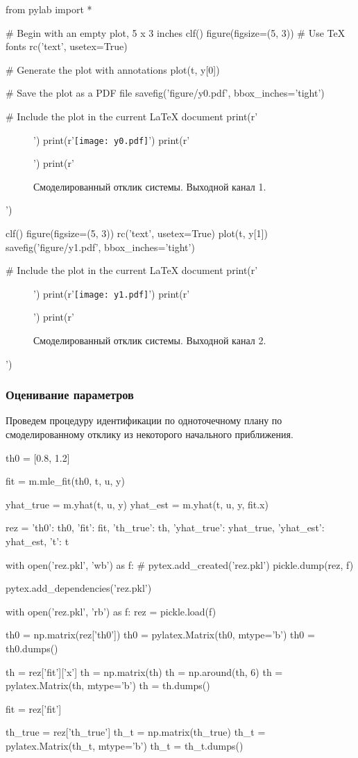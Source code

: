 \documentclass[a4paper,14pt]{extarticle}
\begin{document}
\begin{pycode}[model]
from pylab import *

# Begin with an empty plot, 5 x 3 inches
clf()
figure(figsize=(5, 3))
# Use TeX fonts
rc('text', usetex=True)

# Generate the plot with annotations
plot(t, y[0])

# Save the plot as a PDF file
savefig('figure/y0.pdf', bbox_inches='tight')

# Include the plot in the current LaTeX document
print(r'\begin{figure}[H]')
print(r'\texttt{[image: y0.pdf]}')
print(r'\caption{Смоделированный отклик системы. Выходной канал 1.}')
print(r'\end{figure}')

clf()
figure(figsize=(5, 3))
rc('text', usetex=True)
plot(t, y[1])
savefig('figure/y1.pdf', bbox_inches='tight')

# Include the plot in the current LaTeX document
print(r'\begin{figure}[H]')
print(r'\texttt{[image: y1.pdf]}')
print(r'\caption{Смоделированный отклик системы. Выходной канал 2.}')
print(r'\end{figure}')
\end{pycode}
\renewcommand{\baselinestretch}{1.5}

\subsubsection{Оценивание параметров}

Проведем процедуру идентификации по одноточечному плану по смоделированному
отклику из некоторого начального приближения.

\begin{pycode}[model]
th0 = [0.8, 1.2]


fit = m.mle_fit(th0, t, u, y)


yhat_true = m.yhat(t, u, y)
yhat_est = m.yhat(t, u, y, fit.x)

rez = {'th0': th0, 'fit': fit, 'th_true': th, 'yhat_true': yhat_true,
	'yhat_est': yhat_est, 't': t}

with open('rez.pkl', 'wb') as f:
	# pytex.add_created('rez.pkl')
	pickle.dump(rez, f)

\end{pycode}

\begin{pycode}
pytex.add_dependencies('rez.pkl')

with open('rez.pkl', 'rb') as f:
	rez = pickle.load(f)

th0 = np.matrix(rez['th0'])
th0 = pylatex.Matrix(th0, mtype='b')
th0 = th0.dumps()

th = rez['fit']['x']
th = np.matrix(th)
th = np.around(th, 6)
th = pylatex.Matrix(th, mtype='b')
th = th.dumps()

fit = rez['fit']

th_true = rez['th_true']
th_t = np.matrix(th_true)
th_t = pylatex.Matrix(th_t, mtype='b')
th_t = th_t.dumps()

\end{pycode}
\end{document}
